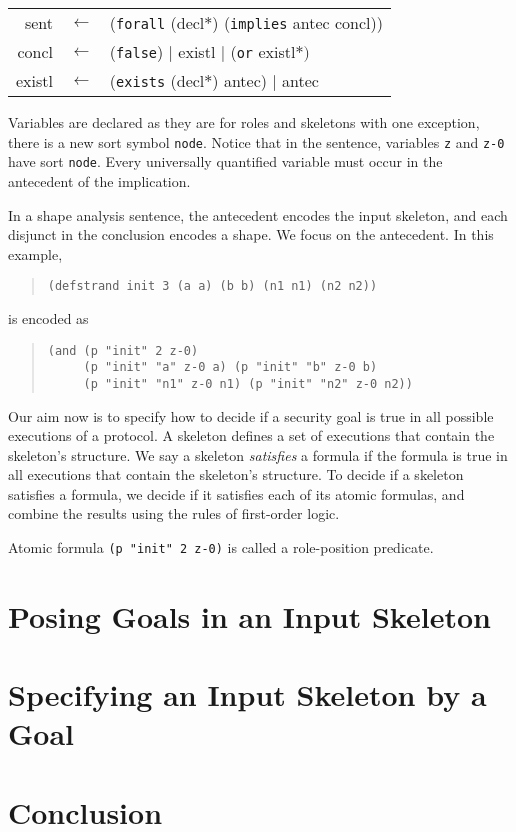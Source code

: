 \documentclass[12pt]{article}
\newcommand{\sym}[1]{\textup{\texttt{#1}}}
\begin{document}
\begin{center}\scshape
  \begin{tabular}{rcl}
  sent&$\leftarrow$&(\sym{forall} (decl$\ast$) (\sym{implies} antec concl))
  \\ concl&$\leftarrow$&(\sym{false})
  $\mid$ existl $\mid$ (\sym{or} existl$\ast)$
  \\ existl&$\leftarrow$&(\sym{exists}
  (decl$\ast$) antec) $\mid$ antec
  \end{tabular}
\end{center}

Variables are declared as they are for roles and skeletons with one
exception, there is a new sort symbol \sym{node}.  Notice that in the
sentence, variables \sym{z} and \sym{z-0} have sort \sym{node}.  Every
universally quantified variable must occur in the antecedent of the
implication.

In a shape analysis sentence, the antecedent encodes the input
skeleton, and each disjunct in the conclusion encodes a shape.
We focus on the antecedent.  In this example,

\begin{quote}
\begin{verbatim}
(defstrand init 3 (a a) (b b) (n1 n1) (n2 n2))
\end{verbatim}
\end{quote}
is encoded as
\begin{quote}
\begin{verbatim}
(and (p "init" 2 z-0)
     (p "init" "a" z-0 a) (p "init" "b" z-0 b)
     (p "init" "n1" z-0 n1) (p "init" "n2" z-0 n2))
\end{verbatim}
\end{quote}

Our aim now is to specify how to decide if a security goal is true in
all possible executions of a protocol.  A skeleton defines a set of
executions that contain the skeleton's structure.  We say a skeleton
\emph{satisfies} a formula if the formula is true in all executions
that contain the skeleton's structure.  To decide if a skeleton
satisfies a formula, we decide if it satisfies each of its atomic
formulas, and combine the results using the rules of first-order
logic.

Atomic formula \texttt{(p "init" 2 z-0)} is called a role-position
predicate.  

\section{Posing Goals in an Input Skeleton}\label{sec:posing}

\section{Specifying an Input Skeleton by a Goal}\label{sec:specifying}

\section{Conclusion}\label{sec:conclusion}



\end{document}
